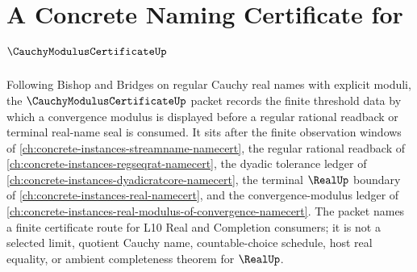 \chapter{A Concrete Naming Certificate for $\CauchyModulusCertificateUp$}
\label{ch:concrete-instances-cauchy-modulus-certificate-namecert}

Following Bishop and Bridges on regular Cauchy real names with explicit moduli, the $\CauchyModulusCertificateUp$ packet records the finite threshold data by which a convergence modulus is displayed before a regular rational readback or terminal real-name seal is consumed. It sits after the finite observation windows of \autoref{ch:concrete-instances-streamname-namecert}, the regular rational readback of \autoref{ch:concrete-instances-regseqrat-namecert}, the dyadic tolerance ledger of \autoref{ch:concrete-instances-dyadicratcore-namecert}, the terminal $\RealUp$ boundary of \autoref{ch:concrete-instances-real-namecert}, and the convergence-modulus ledger of \autoref{ch:concrete-instances-real-modulus-of-convergence-namecert}. The packet names a finite certificate route for L10 Real and Completion consumers; it is not a selected limit, quotient Cauchy name, countable-choice schedule, host real equality, or ambient completeness theorem for $\RealUp$.


